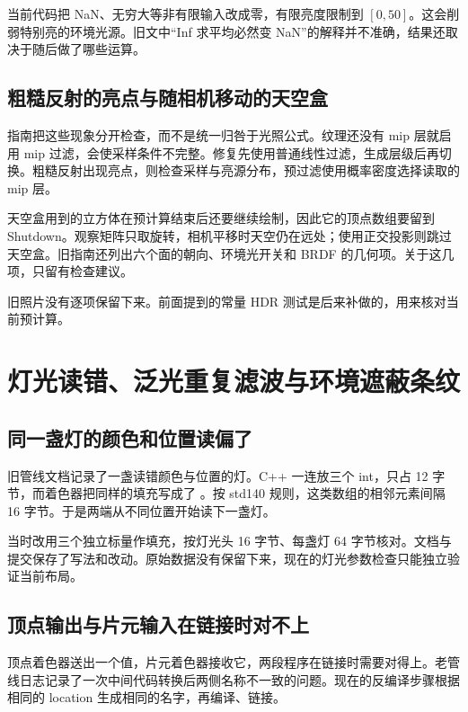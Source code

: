当前代码把 NaN、无穷大等非有限输入改成零，有限亮度限制到 $[0,50]$。这会削弱特别亮的环境光源。旧文中“Inf 求平均必然变 NaN”的解释并不准确，结果还取决于随后做了哪些运算。

\subsection{粗糙反射的亮点与随相机移动的天空盒}
指南把这些现象分开检查，而不是统一归咎于光照公式。纹理还没有 mip 层就启用 mip 过滤，会使采样条件不完整。修复先使用普通线性过滤，生成层级后再切换。粗糙反射出现亮点，则检查采样与亮源分布，预过滤使用概率密度选择读取的 mip 层。

天空盒用到的立方体在预计算结束后还要继续绘制，因此它的顶点数组要留到 Shutdown。观察矩阵只取旋转，相机平移时天空仍在远处；使用正交投影则跳过天空盒。旧指南还列出六个面的朝向、环境光开关和 BRDF 的几何项。关于这几项，只留有检查建议。

旧照片没有逐项保留下来。前面提到的常量 HDR 测试是后来补做的，用来核对当前预计算。

\newpage
\section{灯光读错、泛光重复滤波与环境遮蔽条纹}
\subsection{同一盏灯的颜色和位置读偏了}
旧管线文档记录了一盏读错颜色与位置的灯。C++ 一连放三个 int，只占 12 字节，而着色器把同样的填充写成了 。按 std140 规则，这类数组的相邻元素间隔 16 字节。于是两端从不同位置开始读下一盏灯。

当时改用三个独立标量作填充，按灯光头 16 字节、每盏灯 64 字节核对。文档与提交保存了写法和改动。原始数据没有保留下来，现在的灯光参数检查只能独立验证当前布局。

\subsection{顶点输出与片元输入在链接时对不上}
顶点着色器送出一个值，片元着色器接收它，两段程序在链接时需要对得上。老管线日志记录了一次中间代码转换后两侧名称不一致的问题。现在的反编译步骤根据相同的 location 生成相同的名字，再编译、链接。

